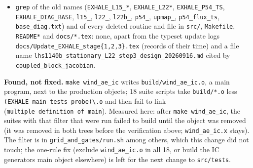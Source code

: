 \documentclass[english,a4paper]{my_memo}
\begin{document}
\begin{itemize}
  Suites that use a touched module directly (35 in v1.00 counting \texttt{element\_census\_tests}, \texttt{closure\_returned\_state} and \texttt{grid\_and\_gates}; 38 in v1.10): every v1.00 suite passes. The rows of the suites run earlier the same day (\texttt{physics\_probe}, \texttt{carrier\_retry}, \texttt{charge\_exchange\_rows}, \texttt{certification}, \texttt{krylov\_and\_dogleg}, \texttt{coupled\_block\_handover}, \texttt{coupled\_source\_step}, \texttt{element\_operator}, \texttt{attempted\_step}, \texttt{spectrum\_type}, \texttt{closure\_returned\_state}) have the same verdicts in both trees. v1.10 failures, each present before these edits: \texttt{carrier\_retry} \texttt{the\_full\_term\_scale\_accepts\_the\_imbalance\_at\_a\_short\_step} and the missing-input rows of \texttt{charge\_exchange\_rows}, \texttt{coupled\_block\_jacobian} and \texttt{physics\_probe} (section 148); \texttt{carrier\_helium\_inventory} (2 rows), \texttt{carrier\_returned\_state\_acceptance} (1), \texttt{helium\_metastable\_transport} (2) and \texttt{steady\_species\_rows} (9), which give the same verdicts on a copy of the v1.10 source with these edits reversed. \texttt{grid\_and\_gates} (run separately: 28 min in v1.00, 52 min in v1.10) gives the same verdicts as the run made earlier the same day, 384 rows in v1.00 and 349 in v1.10, with the failures recorded in section 148 (the three \texttt{stationary\_evaluate\_*} rows in both trees, \texttt{outer\_iteration\_ending\_is\_the\_stagnation\_one} in v1.00, and the v1.10 rows whose inputs are not in that tree).
\item
  \texttt{grep} of the old names (\texttt{EXHALE\_L15\_*}, \texttt{EXHALE\_L22*}, \texttt{EXHALE\_P54\_TS}, \texttt{EXHALE\_DIAG\_BASE}, \texttt{l15\_}, \texttt{l22\_}, \texttt{l22b\_}, \texttt{p54\_}, \texttt{upmap\_}, \texttt{p54\_flux\_ts}, \texttt{base\_diag.txt}) and of every deleted routine and file in \texttt{src/}, \texttt{Makefile}, \texttt{README*} and \texttt{docs/*.tex}: none, apart from the typeset update logs \texttt{docs/Update\_EXHALE\_stage\{1,2,3\}.tex} (records of their time) and a file name \texttt{lhs1140b\_stationary\_L22\_step3\_design\_20260916.md} cited by \texttt{coupled\_block\_jacobian}.
\end{itemize}

\textbf{Found, not fixed.} \texttt{make\ wind\_ae\_ic} writes \texttt{build/wind\_ae\_ic.o}, a main program, next to the production objects; 18 suite scripts take \texttt{build/*.o} less \texttt{(EXHALE\_main\textbar{}\_tests\textbar{}\_probe)\textbackslash{}.o} and then fail to link (\texttt{multiple\ definition\ of\ main}). Measured here: after \texttt{make\ wind\_ae\_ic}, the suites with that filter that were run failed to build until the object was removed (it was removed in both trees before the verification above; \texttt{wind\_ae\_ic.x} stays). The filter is in \texttt{grid\_and\_gates/run.sh} among others, which this change did not touch; the one-rule fix (exclude \texttt{wind\_ae\_ic.o} in all 18, or build the IC generator\textquotesingle s main object elsewhere) is left for the next change to \texttt{src/tests}.
\end{document}
